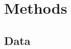 \documentclass{article}
\begin{document}







\section{\label{sec:methods}Methods}

\subsection{\label{sec:data}Data}
\end{document}
